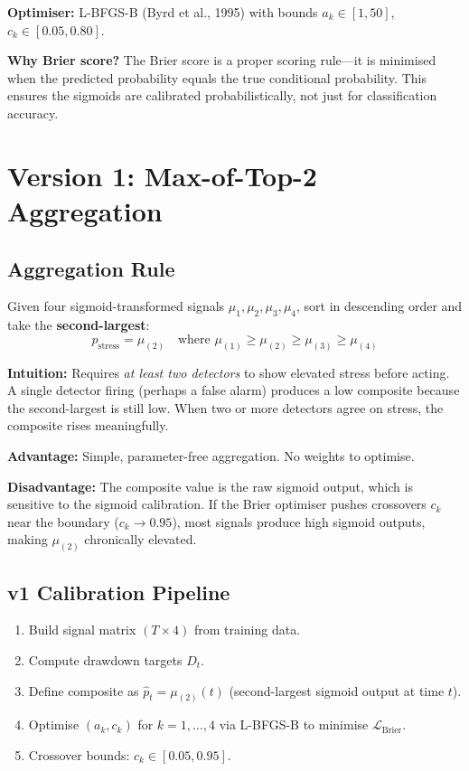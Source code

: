 \documentclass[11pt,a4paper]{article}
\begin{document}
\textbf{Optimiser:} L-BFGS-B (Byrd et al., 1995) with bounds $a_k \in [1, 50]$, $c_k \in [0.05, 0.80]$.

\textbf{Why Brier score?} The Brier score is a proper scoring rule---it is minimised when the predicted probability equals the true conditional probability. This ensures the sigmoids are calibrated probabilistically, not just for classification accuracy.

\section{Version 1: Max-of-Top-2 Aggregation}
\label{sec:v1}

\subsection{Aggregation Rule}

Given four sigmoid-transformed signals $\mu_1, \mu_2, \mu_3, \mu_4$, sort in descending order and take the \textbf{second-largest}:
\begin{equation}
  p_{\mathrm{stress}} = \mu_{(2)} \quad \text{where } \mu_{(1)} \ge \mu_{(2)} \ge \mu_{(3)} \ge \mu_{(4)} \label{eq:max-top-2}
\end{equation}

\textbf{Intuition:} Requires \emph{at least two detectors} to show elevated stress before acting. A single detector firing (perhaps a false alarm) produces a low composite because the second-largest is still low. When two or more detectors agree on stress, the composite rises meaningfully.

\textbf{Advantage:} Simple, parameter-free aggregation. No weights to optimise.

\textbf{Disadvantage:} The composite value is the raw sigmoid output, which is sensitive to the sigmoid calibration. If the Brier optimiser pushes crossovers $c_k$ near the boundary ($c_k \to 0.95$), most signals produce high sigmoid outputs, making $\mu_{(2)}$ chronically elevated.

\subsection{v1 Calibration Pipeline}

\begin{enumerate}[nosep]
  \item Build signal matrix $(T \times 4)$ from training data.
  \item Compute drawdown targets $D_t$.
  \item Define composite as $\hat{p}_t = \mu_{(2)}(t)$ (second-largest sigmoid output at time $t$).
  \item Optimise $(a_k, c_k)$ for $k=1,\ldots,4$ via L-BFGS-B to minimise $\mathcal{L}_{\mathrm{Brier}}$.
  \item Crossover bounds: $c_k \in [0.05, 0.95]$.
\end{enumerate}
\end{document}
